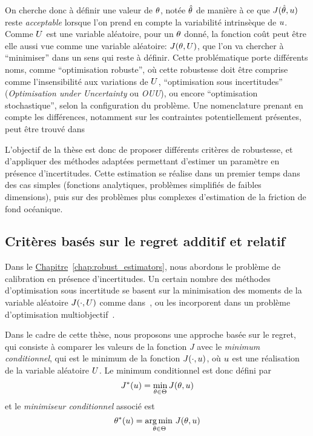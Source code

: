 \documentclass[../../Main_ManuscritThese.tex]{subfiles}
\newcommand{\frchap}[1]{\hyperref[#1]{Chapitre}~\ref{#1}}
\begin{document}
On cherche donc à définir une valeur de $\theta$, notée $\hat{\theta}$ de
manière à ce que $J(\hat{\theta}, u)$ reste \emph{acceptable} lorsque
l'on prend en compte la variabilité intrinsèque de $u$. Comme $U$
est une variable aléatoire, pour un $\theta$ donné, la fonction coût peut
être elle aussi vue comme une variable aléatoire: $J(\theta,U)$, que
l'on va chercher à ``minimiser'' dans un sens qui reste à définir.
Cette problématique porte différents noms, comme ``optimisation
robuste'', où cette robustesse doit être comprise comme
l'insensibilité aux variations de $U$, ``optimisation sous
incertitudes'' (\emph{Optimisation under Uncertainty} ou \emph{OUU}),
ou encore ``optimisation stochastique'', selon la configuration du
problème. Une nomenclature prenant en compte les différences,
notamment sur les contraintes potentiellement présentes, peut être
trouvé dans~\cite{lelievre_consideration_2016}


L'objectif de la thèse est donc de proposer différents critères de
robustesse, et d'appliquer des méthodes adaptées permettant d'estimer
un paramètre en présence d'incertitudes. Cette estimation se réalise
dans un premier temps dans des cas simples (fonctions analytiques,
problèmes simplifiés de faibles dimensions), puis sur des problèmes
plus complexes d'estimation de la friction de fond océanique.

\subsection*{Critères basés sur le regret additif et relatif}
Dans le \frchap{chap:robust_estimators}, nous abordons le problème de
calibration en présence d'incertitudes. Un certain nombre des méthodes
d'optimisation sous incertitude se basent sur la minimisation des
moments de la variable aléatoire $J(\mathbf{\cdot}, U)$ comme
dans~\cite{lehman_designing_2004,janusevskis_simultaneous_2010}, ou
les incorporent dans un problème d'optimisation
multiobjectif~\citep{baudoui_optimisation_2012,ribaud_krigeage_2018}.

Dans le cadre de cette thèse, nous proposons une approche basée sur le
regret, qui consiste à comparer les valeurs de la fonction $J$ avec le
\emph{minimum conditionnel}, qui est le minimum de la fonction
$J(\cdot, u)$, où $u$ est une réalisation de la variable aléatoire
$U$. Le minimum conditionnel est donc défini par
\begin{equation*}
  \label{eq:Jstar}
  J^*(u) = \min_{\theta\in\Theta} J(\theta,u)
\end{equation*}
et le \emph{minimiseur conditionnel} associé est
\begin{equation*}
  \label{eq:Kstar}
  \theta^*(u) = \operatorname*{arg\,min \,}_{\theta\in \Theta}J(\theta,u)
\end{equation*}
\end{document}

